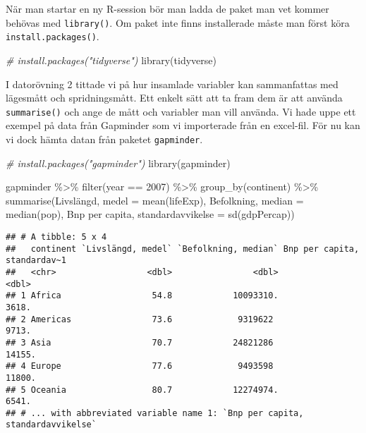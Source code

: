 \documentclass[
]{book}
\newenvironment{Shaded}{\begin{snugshade}}{\end{snugshade}}
\newcommand{\AttributeTok}[1]{\textcolor[rgb]{0.77,0.63,0.00}{#1}}
\newcommand{\CommentTok}[1]{\textcolor[rgb]{0.56,0.35,0.01}{\textit{#1}}}
\newcommand{\DecValTok}[1]{\textcolor[rgb]{0.00,0.00,0.81}{#1}}
\newcommand{\FunctionTok}[1]{\textcolor[rgb]{0.00,0.00,0.00}{#1}}
\newcommand{\NormalTok}[1]{#1}
\newcommand{\OtherTok}[1]{\textcolor[rgb]{0.56,0.35,0.01}{#1}}
\newcommand{\SpecialCharTok}[1]{\textcolor[rgb]{0.00,0.00,0.00}{#1}}
\newcommand{\StringTok}[1]{\textcolor[rgb]{0.31,0.60,0.02}{#1}}
\theoremstyle{definition}
\theoremstyle{definition}
\theoremstyle{definition}
\theoremstyle{definition}
\theoremstyle{remark}
\begin{document}
När man startar en ny R-session bör man ladda de paket man vet kommer behövas med \texttt{library()}. Om paket inte finns installerade måste man först köra \texttt{install.packages()}.

\begin{Shaded}
\begin{Highlighting}[]
\CommentTok{\# install.packages("tidyverse")}
\FunctionTok{library}\NormalTok{(tidyverse)}
\end{Highlighting}
\end{Shaded}

I datorövning 2 tittade vi på hur insamlade variabler kan sammanfattas med lägesmått och spridningsmått. Ett enkelt sätt att ta fram dem är att använda \texttt{summarise()} och ange de mått och variabler man vill använda. Vi hade uppe ett exempel på data från Gapminder som vi importerade från en excel-fil. För nu kan vi dock hämta datan från paketet \texttt{gapminder}.

\begin{Shaded}
\begin{Highlighting}[]
\CommentTok{\# install.packages("gapminder")}
\FunctionTok{library}\NormalTok{(gapminder)}

\NormalTok{gapminder }\SpecialCharTok{\%\textgreater{}\%} 
  \FunctionTok{filter}\NormalTok{(year }\SpecialCharTok{==} \DecValTok{2007}\NormalTok{) }\SpecialCharTok{\%\textgreater{}\%} 
  \FunctionTok{group\_by}\NormalTok{(continent) }\SpecialCharTok{\%\textgreater{}\%} 
  \FunctionTok{summarise}\NormalTok{(}\StringTok{\textasciigrave{}}\AttributeTok{Livslängd, medel}\StringTok{\textasciigrave{}} \OtherTok{=} \FunctionTok{mean}\NormalTok{(lifeExp),}
            \StringTok{\textasciigrave{}}\AttributeTok{Befolkning, median}\StringTok{\textasciigrave{}} \OtherTok{=} \FunctionTok{median}\NormalTok{(pop),}
            \StringTok{\textasciigrave{}}\AttributeTok{Bnp per capita, standardavvikelse}\StringTok{\textasciigrave{}} \OtherTok{=} \FunctionTok{sd}\NormalTok{(gdpPercap))}
\end{Highlighting}
\end{Shaded}

\begin{verbatim}
## # A tibble: 5 x 4
##   continent `Livslängd, medel` `Befolkning, median` Bnp per capita, standardav~1
##   <chr>                  <dbl>                <dbl>                        <dbl>
## 1 Africa                  54.8            10093310.                        3618.
## 2 Americas                73.6             9319622                         9713.
## 3 Asia                    70.7            24821286                        14155.
## 4 Europe                  77.6             9493598                        11800.
## 5 Oceania                 80.7            12274974.                        6541.
## # ... with abbreviated variable name 1: `Bnp per capita, standardavvikelse`
\end{verbatim}
\end{document}
